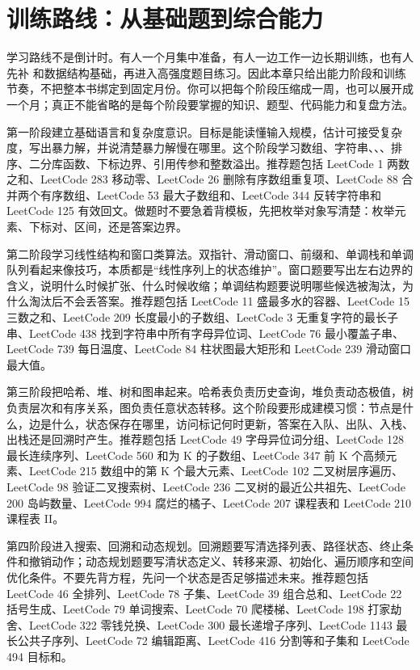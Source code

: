 \section{训练路线：从基础题到综合能力}

学习路线不是倒计时。有人一个月集中准备，有人一边工作一边长期训练，也有人先补 \cpp 和数据结构基础，再进入高强度题目练习。因此本章只给出能力阶段和训练节奏，不把整本书绑定到固定月份。你可以把每个阶段压缩成一周，也可以展开成一个月；真正不能省略的是每个阶段要掌握的知识、题型、代码能力和复盘方法。

第一阶段建立基础语言和复杂度意识。目标是能读懂输入规模，估计可接受复杂度，写出暴力解，并说清楚暴力解慢在哪里。这个阶段学习数组、字符串、、、排序、二分库函数、下标边界、引用传参和整数溢出。推荐题包括 LeetCode 1 两数之和、LeetCode 283 移动零、LeetCode 26 删除有序数组重复项、LeetCode 88 合并两个有序数组、LeetCode 53 最大子数组和、LeetCode 344 反转字符串和 LeetCode 125 有效回文。做题时不要急着背模板，先把枚举对象写清楚：枚举元素、下标对、区间，还是答案边界。

第二阶段学习线性结构和窗口类算法。双指针、滑动窗口、前缀和、单调栈和单调队列看起来像技巧，本质都是“线性序列上的状态维护”。窗口题要写出左右边界的含义，说明什么时候扩张、什么时候收缩；单调结构题要说明哪些候选被淘汰，为什么淘汰后不会丢答案。推荐题包括 LeetCode 11 盛最多水的容器、LeetCode 15 三数之和、LeetCode 209 长度最小的子数组、LeetCode 3 无重复字符的最长子串、LeetCode 438 找到字符串中所有字母异位词、LeetCode 76 最小覆盖子串、LeetCode 739 每日温度、LeetCode 84 柱状图最大矩形和 LeetCode 239 滑动窗口最大值。

第三阶段把哈希、堆、树和图串起来。哈希表负责历史查询，堆负责动态极值，树负责层次和有序关系，图负责任意状态转移。这个阶段要形成建模习惯：节点是什么，边是什么，状态保存在哪里，访问标记何时更新，答案在入队、出队、入栈、出栈还是回溯时产生。推荐题包括 LeetCode 49 字母异位词分组、LeetCode 128 最长连续序列、LeetCode 560 和为 K 的子数组、LeetCode 347 前 K 个高频元素、LeetCode 215 数组中的第 K 个最大元素、LeetCode 102 二叉树层序遍历、LeetCode 98 验证二叉搜索树、LeetCode 236 二叉树的最近公共祖先、LeetCode 200 岛屿数量、LeetCode 994 腐烂的橘子、LeetCode 207 课程表和 LeetCode 210 课程表 II。

第四阶段进入搜索、回溯和动态规划。回溯题要写清选择列表、路径状态、终止条件和撤销动作；动态规划题要写清状态定义、转移来源、初始化、遍历顺序和空间优化条件。不要先背方程，先问一个状态是否足够描述未来。推荐题包括 LeetCode 46 全排列、LeetCode 78 子集、LeetCode 39 组合总和、LeetCode 22 括号生成、LeetCode 79 单词搜索、LeetCode 70 爬楼梯、LeetCode 198 打家劫舍、LeetCode 322 零钱兑换、LeetCode 300 最长递增子序列、LeetCode 1143 最长公共子序列、LeetCode 72 编辑距离、LeetCode 416 分割等和子集和 LeetCode 494 目标和。

